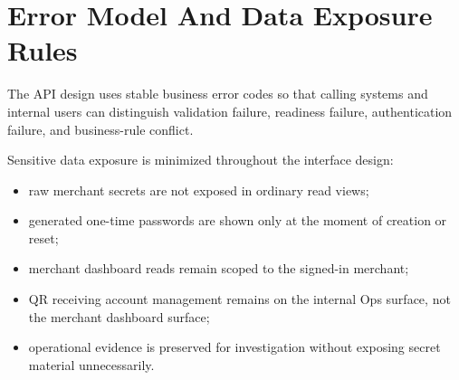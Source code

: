 \section{Error Model And Data Exposure Rules}

The API design uses stable business error codes so that calling systems and
internal users can distinguish validation failure, readiness failure,
authentication failure, and business-rule conflict.

Sensitive data exposure is minimized throughout the interface design:

\begin{itemize}
  \item raw merchant secrets are not exposed in ordinary read views;
  \item generated one-time passwords are shown only at the moment of creation
  or reset;
  \item merchant dashboard reads remain scoped to the signed-in merchant;
  \item QR receiving account management remains on the internal Ops surface,
  not the merchant dashboard surface;
  \item operational evidence is preserved for investigation without exposing
  secret material unnecessarily.
\end{itemize}
